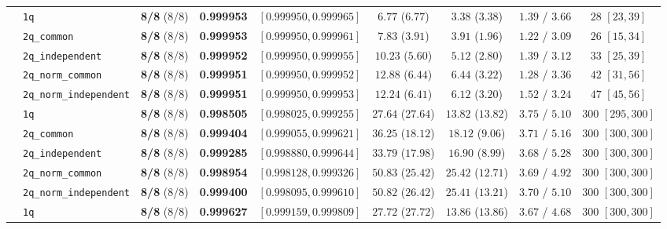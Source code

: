 \documentclass[11pt,a4paper]{article}
\begin{document}
\begin{table}[H]
{\begin{tabular}{llccccccc}
 & \texttt{1q} & \textbf{8/8} (8/8) & \textbf{0.999953} & $[0.999950, 0.999965]$ & $6.77$ ($6.77$) & $3.38$ ($3.38$) & $1.39$ / $3.66$ & $28$ $[23, 39]$ \\
 & \texttt{2q\_common} & \textbf{8/8} (8/8) & \textbf{0.999953} & $[0.999950, 0.999961]$ & $7.83$ ($3.91$) & $3.91$ ($1.96$) & $1.22$ / $3.09$ & $26$ $[15, 34]$ \\
 & \texttt{2q\_independent} & \textbf{8/8} (8/8) & \textbf{0.999952} & $[0.999950, 0.999955]$ & $10.23$ ($5.60$) & $5.12$ ($2.80$) & $1.39$ / $3.12$ & $33$ $[25, 39]$ \\
 & \texttt{2q\_norm\_common} & \textbf{8/8} (8/8) & \textbf{0.999951} & $[0.999950, 0.999952]$ & $12.88$ ($6.44$) & $6.44$ ($3.22$) & $1.28$ / $3.36$ & $42$ $[31, 56]$ \\
 & \texttt{2q\_norm\_independent} & \textbf{8/8} (8/8) & \textbf{0.999951} & $[0.999950, 0.999953]$ & $12.24$ ($6.41$) & $6.12$ ($3.20$) & $1.52$ / $3.24$ & $47$ $[45, 56]$ \\
\midrule
{}
 & \texttt{1q} & \textbf{8/8} (8/8) & \textbf{0.998505} & $[0.998025, 0.999255]$ & $27.64$ ($27.64$) & $13.82$ ($13.82$) & $3.75$ / $5.10$ & $300$ $[295, 300]$ \\
 & \texttt{2q\_common} & \textbf{8/8} (8/8) & \textbf{0.999404} & $[0.999055, 0.999621]$ & $36.25$ ($18.12$) & $18.12$ ($9.06$) & $3.71$ / $5.16$ & $300$ $[300, 300]$ \\
 & \texttt{2q\_independent} & \textbf{8/8} (8/8) & \textbf{0.999285} & $[0.998880, 0.999644]$ & $33.79$ ($17.98$) & $16.90$ ($8.99$) & $3.68$ / $5.28$ & $300$ $[300, 300]$ \\
 & \texttt{2q\_norm\_common} & \textbf{8/8} (8/8) & \textbf{0.998954} & $[0.998128, 0.999326]$ & $50.83$ ($25.42$) & $25.42$ ($12.71$) & $3.69$ / $4.92$ & $300$ $[300, 300]$ \\
 & \texttt{2q\_norm\_independent} & \textbf{8/8} (8/8) & \textbf{0.999400} & $[0.998095, 0.999610]$ & $50.82$ ($26.42$) & $25.41$ ($13.21$) & $3.70$ / $5.10$ & $300$ $[300, 300]$ \\
\midrule
{}
 & \texttt{1q} & \textbf{8/8} (8/8) & \textbf{0.999627} & $[0.999159, 0.999809]$ & $27.72$ ($27.72$) & $13.86$ ($13.86$) & $3.67$ / $4.68$ & $300$ $[300, 300]$ \\

\end{tabular}}
\end{table}
\end{document}
